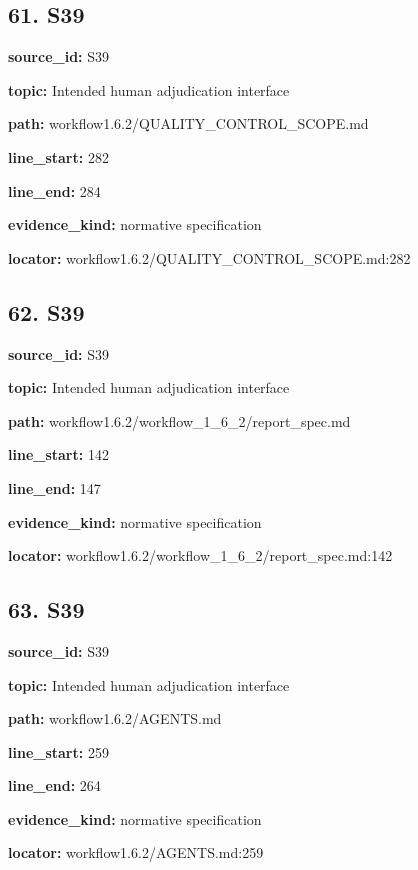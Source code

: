 \documentclass[10pt,a4paper]{article}
\begin{document}
\subsection*{61.\allowbreak{} S39}
\textbf{source\_\allowbreak{}id:} S39\par
\textbf{topic:} Intended human adjudication interface\par
\textbf{path:} workflow1.\allowbreak{}6.\allowbreak{}2/\allowbreak{}QUALITY\_\allowbreak{}CONTROL\_\allowbreak{}SCOPE.\allowbreak{}md\par
\textbf{line\_\allowbreak{}start:} 282\par
\textbf{line\_\allowbreak{}end:} 284\par
\textbf{evidence\_\allowbreak{}kind:} normative specification\par
\textbf{locator:} workflow1.\allowbreak{}6.\allowbreak{}2/\allowbreak{}QUALITY\_\allowbreak{}CONTROL\_\allowbreak{}SCOPE.\allowbreak{}md:282\par
\subsection*{62.\allowbreak{} S39}
\textbf{source\_\allowbreak{}id:} S39\par
\textbf{topic:} Intended human adjudication interface\par
\textbf{path:} workflow1.\allowbreak{}6.\allowbreak{}2/\allowbreak{}workflow\_\allowbreak{}1\_\allowbreak{}6\_\allowbreak{}2/\allowbreak{}report\_\allowbreak{}spec.\allowbreak{}md\par
\textbf{line\_\allowbreak{}start:} 142\par
\textbf{line\_\allowbreak{}end:} 147\par
\textbf{evidence\_\allowbreak{}kind:} normative specification\par
\textbf{locator:} workflow1.\allowbreak{}6.\allowbreak{}2/\allowbreak{}workflow\_\allowbreak{}1\_\allowbreak{}6\_\allowbreak{}2/\allowbreak{}report\_\allowbreak{}spec.\allowbreak{}md:142\par
\subsection*{63.\allowbreak{} S39}
\textbf{source\_\allowbreak{}id:} S39\par
\textbf{topic:} Intended human adjudication interface\par
\textbf{path:} workflow1.\allowbreak{}6.\allowbreak{}2/\allowbreak{}AGENTS.\allowbreak{}md\par
\textbf{line\_\allowbreak{}start:} 259\par
\textbf{line\_\allowbreak{}end:} 264\par
\textbf{evidence\_\allowbreak{}kind:} normative specification\par
\textbf{locator:} workflow1.\allowbreak{}6.\allowbreak{}2/\allowbreak{}AGENTS.\allowbreak{}md:259\par
\end{document}
